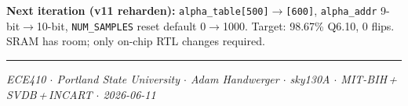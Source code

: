 \documentclass[10pt]{article}
\begin{document}
\textbf{Next iteration (v11 reharden):} \texttt{alpha\_table[500]$\to$[600]},
\texttt{alpha\_addr} 9-bit$\to$10-bit, \texttt{NUM\_SAMPLES} reset default 0$\to$1000.
Target: 98.67\% Q6.10, 0 flips. SRAM has room; only on-chip RTL changes required.

\vspace{0.8em}
\noindent\rule{\linewidth}{0.4pt}
{\small\itshape ECE410 $\cdot$ Portland State University $\cdot$
Adam Handwerger $\cdot$ sky130A $\cdot$ MIT-BIH\,+\,SVDB\,+\,INCART $\cdot$ 2026-06-11}
\end{document}
